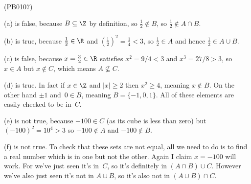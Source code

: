 (PB0107)

(a) is false, because $B\subseteq\Z$ by definition, so $\frac{1}{2}\not\in B$, so $\frac{1}{2}\not\in A\cap B$.

(b) is true, because $\frac12\in\R$ and $\left(\frac12\right)^2=\frac14<3$, so $\frac12\in A$ and hence $\frac12\in A\cup B$.

(c) is false, because $x=\frac32\in\R$ satisfies $x^2=9/4<3$ and $x^3=27/8>3$, so $x\in A$ but $x\not\in C$, which means $A\not\subseteq C$.

(d) is true. In fact if $x\in\Z$ and $|x|\geq2$ then $x^2\geq4$, meaning $x\not\in B$. On the other hand $\pm1$ and~$0\in B$, meaning $B=\{-1,0,1\}$. All of these elements are easily checked to be in~$C$.

(e) is not true, because $-100\in C$ (as its cube is less than zero) but $(-100)^2=10^4>3$ so $-100\not\in A$ and $-100\not\in B$.

(f) is not true. To check that these sets are not equal, all we need to do is to find a real number which is in one but not the other. Again I claim $x=-100$ will work. For we've just seen it's in~$C$, so it's definitely in $(A\cap B)\cup C$. However we've also just seen it's not in $A\cup B$, so it's also not in $(A\cup B)\cap C$.
